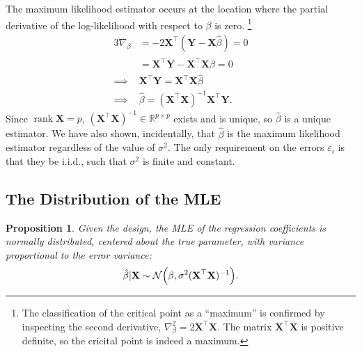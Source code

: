 \documentclass[letterpaper, reqno]{amsart}
\newtheorem{prop}{Proposition}[section]
\numberwithin{equation}{section}
\newcommand{\T}{\top} %
\newcommand{\vect}[1]{\boldsymbol{\mathbf{#1}}} %
\newcommand{\R}{\mathbb{R}}  %
\newcommand{\N}[2]{\mathcal{N}\mleft( #1, #2 \mright)}
\newcommand{\iid}{i.i.d.}
\newcommand{\Xm}{\vect{X}}
\newcommand{\Yv}{\vect{Y}}
\newcommand{\Bv}{\beta}
\newcommand{\Bvh}{\hat{\beta}}
\newcommand{\ve}{\varepsilon}
\DeclareMathOperator{\rank}{rank}
\begin{document}
The maximum likelihood estimator occurs at the location where the partial
derivative of the log-likelihood with respect to $\Bv$ is zero.%
\footnote{The classification of
  the critical point as a ``maximum'' is confirmed by inspecting the second
  derivative, $\nabla_\Bv^2 = 2\Xm^\T \Xm$. The matrix $\Xm^\T \Xm$ is
  positive definite, so the cricital point is indeed a maximum.}
\begin{alignat*}{3}
  \nabla_\Bv &= -2\Xm^\T(\Yv - \Xm\Bvh) = 0 \\
  &= \Xm^\T\Yv - \Xm^\T\Xm\Bvh = 0 \\
  \implies &\Xm^\T\Yv = \Xm^\T\Xm\Bvh \\
  \implies &\Bvh = (\Xm^\T\Xm)^{-1}\Xm^\T\Yv.
\end{alignat*}
Since $\rank \Xm = p$, $(\Xm^\T\Xm)^{-1} \in \R^{p \times p}$ exists and is
unique, so $\Bvh$ is a unique estimator. We have also shown, incidentally, that
$\Bvh$ is the maximum likelihood estimator regardless of the value of
$\sigma^2$. The only requirement on the errors $\ve_i$ is that they be \iid, such
that $\sigma^2$ is finite and constant.

\subsection{The Distribution of the MLE} \label{sec:dist_mle}
\begin{prop}
  Given the design, the MLE of the regression coefficients is normally
  distributed, centered about the true parameter, with variance proportional to
  the error variance:
  \[ \Bvh|\Xm \sim \N{\Bv}{ \sigma^2 (\Xm^\T \Xm)^{-1}}. \]
\end{prop}
\end{document}
